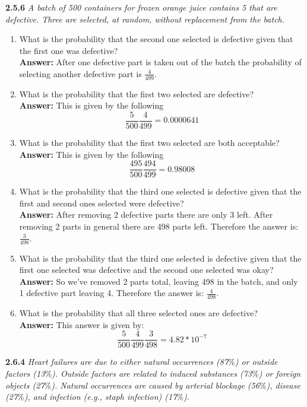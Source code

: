 \documentclass[11pt]{article}
\begin{document}
\noindent \textbf{2.5.6} \emph{ A batch of 500 containers for frozen orange juice contains 5 that are defective. Three are selected, at random, without replacement from the batch.}
\begin{enumerate}
\item What is the probability that the second one selected is defective given that the first one was defective?
\\\textbf{Answer: } After one defective part is taken out of the batch the probability of selecting another defective part is $\frac{4}{499}$.
\item What is the probability that the first two selected are defective?
\\\textbf{Answer: } This is given by the following
\begin{equation}
\frac{5}{500}\frac{4}{499} = 0.0000641
\end{equation}
\item What is the probability that the first two selected are both acceptable?
\\\textbf{Answer: } This is given by the following
\begin{equation}
\frac{495}{500}\frac{494}{499} = 0.98008
\end{equation}
\item What is the probability that the third one selected is defective given that the first and second ones selected were defective?
\\\textbf{Answer: } After removing 2 defective parts there are only 3 left. After removing 2 parts in general there are 498 parts left. Therefore the answer is: $\frac{3}{498}$.
\item What is the probability that the third one selected is defective given that the first one selected was defective and the second one selected was okay?
\\\textbf{Answer: } So we've removed 2 parts total, leaving 498 in the batch, and only 1 defective part leaving 4. Therefore the answer is: $\frac{4}{498}$.
\item What is the probability that all three selected ones are defective?
\\\textbf{Answer: } This answer is given by:
\begin{equation}
\frac{5}{500}\frac{4}{499}\frac{3}{498} = 4.82*10^{-7}
\end{equation}
\end{enumerate}
\noindent \textbf{2.6.4} \emph{Heart failures are due to either natural occurrences (87$\%$) or outside factors (13$\%$). Outside factors are related to induced substances (73$\%$) or foreign objects (27$\%$). Natural occurrences are caused by arterial blockage (56$\%$), disease (27$\%$), and infection (e.g., staph infection) (17$\%$).}
\end{document}
